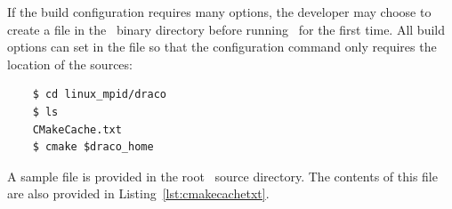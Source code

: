 If the build configuration requires many options, the developer may choose to create a  file in the \draco\ binary directory before running \cmake\ for the first time.  All build options can set in the  file so that the configuration command only requires the location of the sources:
\begin{verbatim}
    $ cd linux_mpid/draco
    $ ls
    CMakeCache.txt
    $ cmake $draco_home
\end{verbatim}
A sample  file is provided in the root \draco\ source directory.  The contents of this file are also provided in Listing~\ref{lst:cmakecachetxt}.
%
